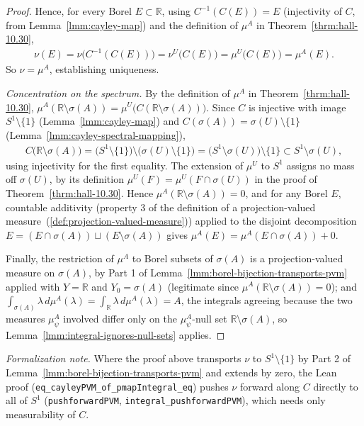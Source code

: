 \begin{proof}
Hence, for every Borel $E \subset \mathbb{R}$, using $C^{-1}(C(E)) = E$ (injectivity of $C$, from Lemma~\ref{lmm:cayley-map}) and the definition of $\mu^A$ in Theorem~\ref{thrm:hall-10.30},
\begin{align}
    \nu(E) = \nu\big( C^{-1}(C(E)) \big) = \nu^U\big( C(E) \big) = \mu^U\big( C(E) \big) = \mu^A(E).
\end{align}
So $\nu = \mu^A$, establishing uniqueness.

\textit{Concentration on the spectrum.} By the definition of $\mu^A$ in Theorem~\ref{thrm:hall-10.30}, $\mu^A(\mathbb{R}\setminus\sigma(A)) = \mu^U\big( C(\mathbb{R}\setminus\sigma(A)) \big)$. Since $C$ is injective with image $S^1\setminus\{1\}$ (Lemma~\ref{lmm:cayley-map}) and $C(\sigma(A)) = \sigma(U)\setminus\{1\}$ (Lemma~\ref{lmm:cayley-spectral-mapping}),
\begin{align}
    C\big( \mathbb{R}\setminus\sigma(A) \big) = \big( S^1\setminus\{1\} \big) \setminus \big( \sigma(U)\setminus\{1\} \big) = \big( S^1 \setminus \sigma(U) \big) \setminus \{1\} \subset S^1\setminus\sigma(U),
\end{align}
using injectivity for the first equality. The extension of $\mu^U$ to $S^1$ assigns no mass off $\sigma(U)$, by its definition $\mu^U(F) = \mu^U(F\cap\sigma(U))$ in the proof of Theorem~\ref{thrm:hall-10.30}. Hence $\mu^A(\mathbb{R}\setminus\sigma(A)) = 0$, and for any Borel $E$, countable additivity (property 3 of the definition of a projection-valued measure~(\ref{def:projection-valued-measure})) applied to the disjoint decomposition $E = (E\cap\sigma(A)) \sqcup (E\setminus\sigma(A))$ gives $\mu^A(E) = \mu^A(E\cap\sigma(A)) + 0$.

Finally, the restriction of $\mu^A$ to Borel subsets of $\sigma(A)$ is a projection-valued measure on $\sigma(A)$, by Part 1 of Lemma~\ref{lmm:borel-bijection-transports-pvm} applied with $Y = \mathbb{R}$ and $Y_0 = \sigma(A)$ (legitimate since $\mu^A(\mathbb{R}\setminus\sigma(A)) = 0$); and $\int_{\sigma(A)}\lambda\,d\mu^A(\lambda) = \int_{\mathbb{R}}\lambda\,d\mu^A(\lambda) = A$, the integrals agreeing because the two measures $\mu^A_\psi$ involved differ only on the $\mu^A_\psi$-null set $\mathbb{R}\setminus\sigma(A)$, so Lemma~\ref{lmm:integral-ignores-null-sets} applies.
\end{proof}

\noindent\textit{Formalization note.} Where the proof above transports $\nu$ to $S^1\setminus\{1\}$ by Part 2 of Lemma~\ref{lmm:borel-bijection-transports-pvm} and extends by zero, the Lean proof (\texttt{eq\_cayleyPVM\_of\_pmapIntegral\_eq}) pushes $\nu$ forward along $C$ directly to all of $S^1$ (\texttt{pushforwardPVM}, \texttt{integral\_pushforwardPVM}), which needs only measurability of $C$.

